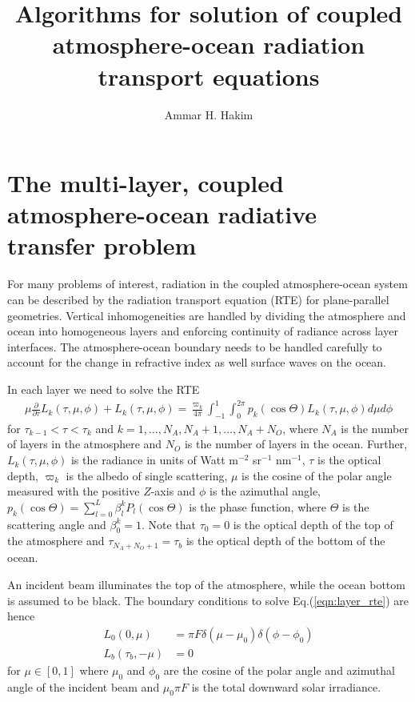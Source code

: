\documentclass[11pt, reqno]{amsart}
\title{Algorithms for solution of coupled atmosphere-ocean radiation
  transport equations}%
\author{Ammar H. Hakim}%
\date{}
\newcommand{\eqr}[1]{Eq.\thinspace(#1)}
\newcommand{\pfraca}[1]{\frac{\partial}{\partial #1}}
\theoremstyle{definition}
\begin{document}
\maketitle

\section{The multi-layer, coupled atmosphere-ocean radiative transfer
  problem}

For many problems of interest, radiation in the coupled
atmosphere-ocean system can be described by the radiation transport
equation (RTE) for plane-parallel geometries. Vertical inhomogeneities
are handled by dividing the atmosphere and ocean into homogeneous
layers and enforcing continuity of radiance across layer
interfaces. The atmosphere-ocean boundary needs to be handled
carefully to account for the change in refractive index as well
surface waves on the ocean.

In each layer we need to solve the RTE
\begin{align}
  \mu\pfraca{\tau}L_k(\tau,\mu,\phi) + L_k(\tau,\mu,\phi)
  =
  \frac{\varpi_k}{4\pi}
  \int_{-1}^1 \int_0^{2\pi}
  p_k(\cos\Theta) L_k(\tau,\mu,\phi) d\mu d\phi
  \label{eqn:layer_rte}
\end{align}
for $\tau_{k-1} < \tau < \tau_k$ and
$k=1,\ldots,N_A,N_A+1,\ldots,N_A+N_O$, where $N_A$ is the number of
layers in the atmosphere and $N_O$ is the number of layers in the
ocean. Further, $L_k(\tau,\mu,\phi)$ is the radiance in units of Watt
m$^{-2}$ sr$^{-1}$ nm$^{-1}$, $\tau$ is the optical depth, $\varpi_k$
is the albedo of single scattering, $\mu$ is the cosine of the polar
angle measured with the positive $Z$-axis and $\phi$ is the azimuthal
angle, $p_k(\cos\Theta) = \sum_{l=0}^L\beta^k_lP_l(\cos\Theta)$ is the
phase function, where $\Theta$ is the scattering angle and
$\beta^k_0=1$. Note that $\tau_0=0$ is the optical depth of the top of
the atmosphere and $\tau_{N_A+N_O+1}=\tau_b$ is the optical depth of
the bottom of the ocean.

An incident beam illuminates the top of the atmosphere, while the
ocean bottom is assumed to be black. The boundary conditions to solve
\eqr{\ref{eqn:layer_rte}} are hence
\begin{align}
  L_0(0, \mu) &= \pi F \delta(\mu-\mu_0) \delta(\phi-\phi_0) \\
  L_b(\tau_b, -\mu) &= 0
\end{align}
for $\mu\in [0,1]$ where $\mu_0$ and $\phi_0$ are the cosine of the
polar angle and azimuthal angle of the incident beam and $\mu_0\pi F$
is the total downward solar irradiance.
\end{document}
